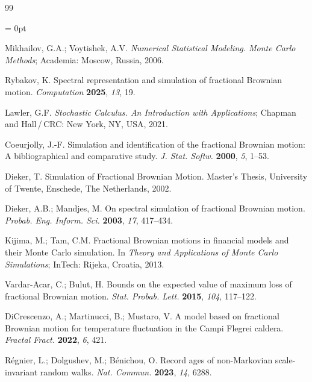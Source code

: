 \documentclass[10pt,reqno]{amsart}
\theoremstyle{plain}
\theoremstyle{remark}
\begin{document}
\begin{thebibliography}{99}

{\parfillskip = 0pt

Mikhailov, G.A.; Voytishek, A.V. {\em Numerical Statistical Modeling. Monte Carlo Methods}; Academia: Moscow, Russia, 2006.

}

Rybakov, K. Spectral representation and simulation of fractional Brownian motion. {\em Computation} {\bf 2025}, {\em 13}, 19.

Lawler, G.F. {\em Stochastic Calculus. An Introduction with Applications}; Chapman and Hall\,/\,CRC: New York, NY, USA, 2021.

Coeurjolly, J.-F. Simulation and identification of the fractional Brownian motion: A bibliographical and comparative study. {\em J. Stat. Softw.} {\bf 2000}, {\em 5}, 1--53.

Dieker, T. Simulation of Fractional Brownian Motion. Master's Thesis, University of Twente, Enschede, The Netherlands, 2002.

Dieker, A.B.; Mandjes, M. On spectral simulation of fractional Brownian motion. {\em Probab. Eng. Inform. Sci.} {\bf 2003}, {\em 17}, 417--434.

Kijima, M.; Tam, C.M. Fractional Brownian motions in financial models and their Monte Carlo simulation. In {\em Theory and Applications of Monte Carlo Simulations}; InTech: Rijeka, Croatia, 2013.

Vardar-Acar, C.; Bulut, H. Bounds on the expected value of maximum loss of fractional Brownian motion. {\em Stat. Probab. Lett.} {\bf 2015}, {\em 104}, 117--122.

Di\;Crescenzo, A.; Martinucci, B.; Mustaro, V. A model based on fractional Brownian motion for temperature fluctuation in the Campi Flegrei caldera. {\em Fractal Fract.} {\bf 2022}, {\em 6}, 421.

R\'{e}gnier, L.; Dolgushev, M.; B\'{e}nichou, O. Record ages of non-Markovian scale-invariant random walks. {\em Nat. Commun.} {\bf 2023}, {\em 14}, 6288.


\end{thebibliography}
\end{document}

